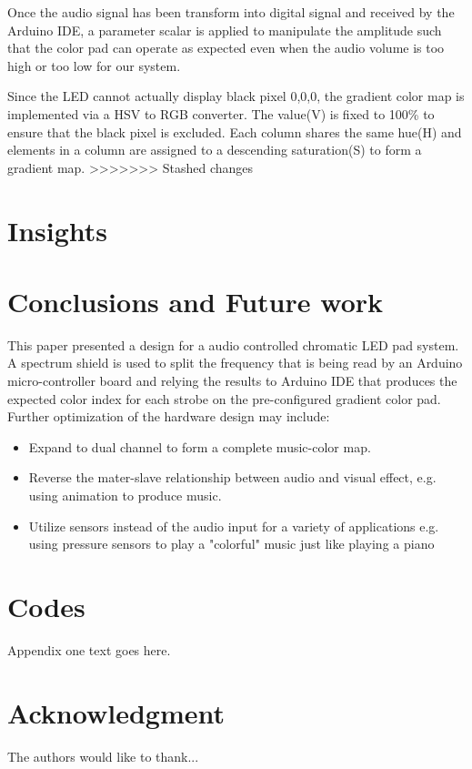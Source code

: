 \documentclass[12pt,a4paper,journal]{IEEEtran}
\begin{document}
Once the audio signal has been transform into digital signal and received by the Arduino IDE, a parameter scalar is applied to manipulate the amplitude such that the color pad can operate as expected even when the audio volume is too high or too low for our system.

Since the LED cannot actually display black pixel {0,0,0}, the gradient color map is implemented via a HSV to RGB converter. The value(V) is fixed to 100\% to ensure that the black pixel is excluded. Each column shares the same hue(H) and elements in a column are assigned to a descending saturation(S) to form a gradient map.
>>>>>>> Stashed changes
\section{Insights}

\section{Conclusions and Future work}
This paper presented a design for a audio controlled chromatic LED pad system. A spectrum shield is used to split the frequency that is being read by an Arduino micro-controller board and relying the results to Arduino IDE that produces the expected color index for each strobe on the pre-configured gradient color pad.
Further optimization of the hardware design may include: 
\begin{itemize}
\item Expand to dual channel to form a complete music-color map. 
\item Reverse the mater-slave relationship between audio and visual effect, e.g. using animation to produce music.
\item Utilize sensors instead of the audio input for a variety of applications e.g. using pressure sensors to play a "colorful" music just like playing a piano
\end{itemize}


\appendices
\section{Codes}
Appendix one text goes here.

\section*{Acknowledgment}


The authors would like to thank...


\ifCLASSOPTIONcaptionsoff
  \newpage
\fi

\end{document}
